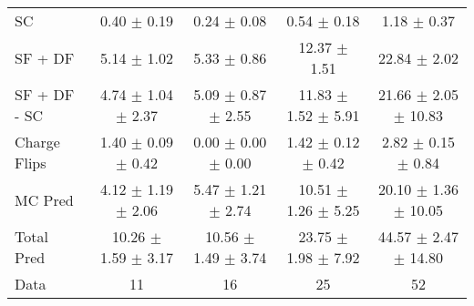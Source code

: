 \begin{tabular}{l|cccc}
                                 SC &  0.40 $\pm$  0.19 &  0.24 $\pm$  0.08 &  0.54 $\pm$  0.18 &  1.18 $\pm$  0.37 \\
                            SF + DF &  5.14 $\pm$  1.02 &  5.33 $\pm$  0.86 & 12.37 $\pm$  1.51 & 22.84 $\pm$  2.02 \\
\hline
                       SF + DF - SC &  4.74 $\pm$  1.04 $\pm$  2.37 &  5.09 $\pm$  0.87 $\pm$  2.55 & 11.83 $\pm$  1.52 $\pm$  5.91 & 21.66 $\pm$  2.05 $\pm$ 10.83 \\
\hline\hline
                       Charge Flips &  1.40 $\pm$  0.09 $\pm$  0.42 &  0.00 $\pm$  0.00 $\pm$  0.00 &  1.42 $\pm$  0.12 $\pm$  0.42 &  2.82 $\pm$  0.15 $\pm$  0.84 \\
\hline
                            MC Pred &  4.12 $\pm$  1.19 $\pm$  2.06 &  5.47 $\pm$  1.21 $\pm$  2.74 & 10.51 $\pm$  1.26 $\pm$  5.25 & 20.10 $\pm$  1.36 $\pm$ 10.05 \\
\hline
                         Total Pred & 10.26 $\pm$  1.59 $\pm$  3.17 & 10.56 $\pm$  1.49 $\pm$  3.74 & 23.75 $\pm$  1.98 $\pm$  7.92 & 44.57 $\pm$  2.47 $\pm$ 14.80 \\
\hline\hline
                               Data &    11 &    16 &    25 &    52 \\
\hline\hline
\end{tabular}

